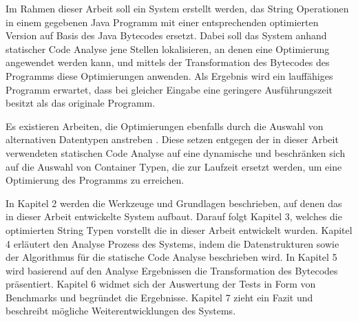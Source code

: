 Im Rahmen dieser Arbeit soll ein System erstellt werden, das String Operationen in einem
gegebenen Java Programm mit einer entsprechenden optimierten Version auf Basis des 
Java Bytecodes ersetzt. Dabei soll das System anhand statischer Code Analyse jene Stellen
lokalisieren, an denen eine Optimierung angewendet werden kann, und mittels der Transformation des 
Bytecodes des Programms diese Optimierungen anwenden. Als Ergebnis wird ein lauffähiges
Programm erwartet, dass bei gleicher Eingabe eine geringere Ausführungszeit besitzt 
als das originale Programm.

Es existieren Arbeiten, die Optimierungen ebenfalls durch die Auswahl von alternativen
Datentypen anstreben \cite{coco, cham, brain}. Diese setzen entgegen der in dieser Arbeit 
verwendeten statischen Code Analyse auf eine dynamische und beschränken sich auf die Auswahl von 
Container Typen, die zur Laufzeit ersetzt werden, um eine Optimierung des Programms zu erreichen.

In Kapitel 2 werden die Werkzeuge und Grundlagen beschrieben, auf denen das in dieser Arbeit
entwickelte System aufbaut. Darauf folgt Kapitel 3, welches die optimierten String Typen vorstellt
die in dieser Arbeit entwickelt wurden. Kapitel 4 erläutert den Analyse Prozess des Systems, indem
die Datenstrukturen sowie der Algorithmus für die statische Code Analyse beschrieben wird.
In Kapitel 5 wird basierend auf den Analyse Ergebnissen die Transformation des Bytecodes 
präsentiert. Kapitel 6 widmet sich der Auswertung der Tests in Form von Benchmarks
und begründet die Ergebnisse. Kapitel 7 zieht ein Fazit und beschreibt mögliche
Weiterentwicklungen des Systems.    